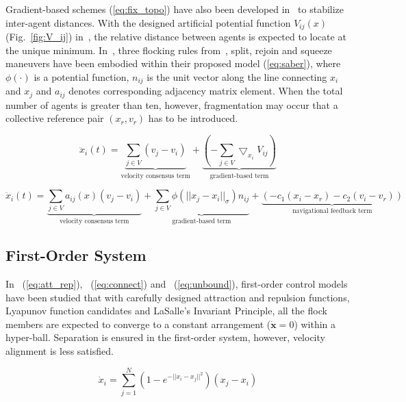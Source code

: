 Gradient-based schemes (\ref{eq:fix_topo}) have also been developed in~\cite{FixedTopology,Saber2004,tanner2007flocking,olfati2002distributed} to stabilize inter-agent distances. With the designed artificial potential function $V_{ij}(x)$ (Fig.~\ref{fig:V_ij}) in~\cite{FixedTopology}, the relative distance between agents is expected to locate at the unique minimum. In~\cite{Saber2004}, three flocking rules from~\cite{Reynolds1987}, split, rejoin and squeeze maneuvers have been embodied within their proposed model (\ref{eq:saber}), where $\phi(\cdot)$ is a potential function, $n_{ij}$ is the unit vector along the line connecting $x_i$ and $x_j$ and $a_{ij}$ denotes corresponding adjacency matrix element. When the total number of agents is greater than ten, however, fragmentation may occur that a collective reference pair $(x_r, v_r)$ has to be introduced.

\begin{equation}\label{eq:fix_topo}
\ddot{x}_i(t)=\underbrace{\sum_{j\in V}(v_j-v_i)}_{\text{velocity consensus term}}+\underbrace{(-\sum_{j\in V}\bigtriangledown_{x_i}V_{ij})}_{\text{gradient-based term}}
\end{equation}

\begin{equation}\label{eq:saber}
\ddot{x}_i(t)=\underbrace{\sum_{j\in V}a_{ij}(x)(v_j-v_i)}_{\text{velocity consensus term}}+\underbrace{\sum_{j\in V}\phi(||x_j-x_i||_{\sigma})n_{ij}}_{\text{gradient-based term}}+\underbrace{(-c_1(x_i-x_r)-c_2(v_i-v_r))}_{\text{navigational feedback term}}
\end{equation}

\subsection{First-Order System}

In~\cite{Stability} (\ref{eq:att_rep}),~\cite{Connectedness} (\ref{eq:connect}) and~\cite{Invariant} (\ref{eq:unbound}), first-order control models have been studied that with carefully designed attraction and repulsion functions, Lyapunov function candidates and LaSalle's Invariant Principle, all the flock members are expected to converge to a constant arrangement ($\dot{\mathbf{x}}=0$) within a hyper-ball. Separation is ensured in the first-order system, however, velocity alignment is less satisfied.

\begin{equation}\label{eq:att_rep}
\dot{x}_i=\sum^N_{j=1}(1-e^{-||x_i-x_j||^2})(x_j-x_i)
\end{equation}

